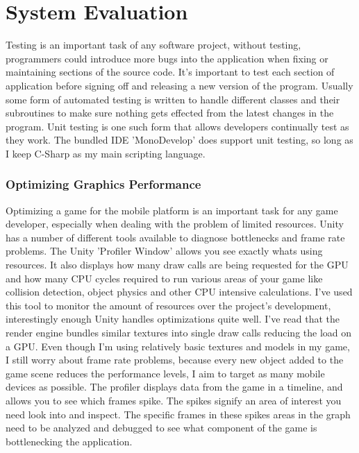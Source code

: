 \chapter{System Evaluation}
Testing is an important task of any software project, without testing, programmers could introduce more bugs into the application when fixing or maintaining sections of the source code. It's important to test each section of application before signing off and releasing a new version of the program. Usually some form of automated testing is written to handle different classes and their subroutines to make sure nothing gets effected from the latest changes in the program. Unit testing is one such form that allows developers continually test as they work. The bundled IDE 'MonoDevelop' does support unit testing, so long as I keep C-Sharp as my main scripting language.
\subsection{Optimizing Graphics Performance}
Optimizing a game for the mobile platform is an important task for any game developer, especially when dealing with the problem of limited resources. Unity has a number of different tools available to diagnose bottlenecks and frame rate problems. The Unity 'Profiler Window' allows you see exactly whats using resources. It also displays how many draw calls are being requested for the GPU and how many CPU cycles required to run various areas of your game like collision detection, object physics and other CPU intensive calculations. I've used this tool to monitor the amount of resources over the project's development, interestingly enough Unity handles optimizations quite well. I've read that the render engine bundles similar textures into single draw calls reducing the load on a GPU. Even though I'm using relatively basic textures and models in my game, I still worry about frame rate problems, because every new object added to the game scene reduces the performance levels, I aim to target as many mobile devices as possible. The profiler displays data from the game in a timeline, and allows you to see which frames spike. The spikes signify an area of interest you need look into and inspect. The specific frames in these spikes areas in the graph need to be analyzed and debugged to see what component of the game is bottlenecking the application.
